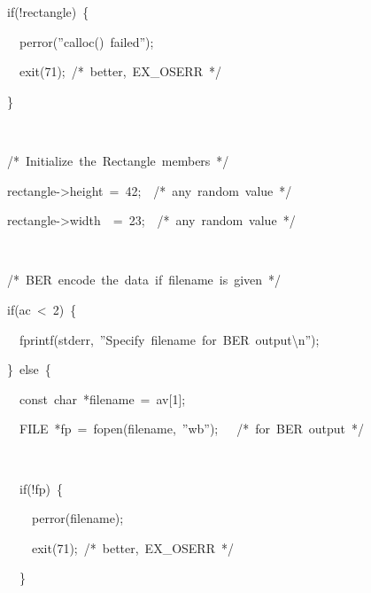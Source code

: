 \documentclass[english,oneside,12pt]{book}
\newenvironment{lyxcode}
{\par\begin{list}{}{
\setlength{\rightmargin}{\leftmargin}
\setlength{\listparindent}{0pt}%
\raggedright
\setlength{\itemsep}{0pt}
\setlength{\parsep}{0pt}
\normalfont\ttfamily}%
 \item[]}
{\end{list}}
\begin{document}
\begin{enumerate}
\begin{lyxcode}
{\small{}~~~~if(!rectangle)~\{}{\small \par}

{\small{}~~~~~~perror(''calloc()~failed'');}{\small \par}

{\small{}~~~~~~exit(71);~/{*}~better,~EX\_OSERR~{*}/}{\small \par}

{\small{}~~~~\}}{\small \par}

{\small{}~}{\small \par}

{\small{}~~~~/{*}~Initialize~the~Rectangle~members~{*}/}{\small \par}

{\small{}~~~~rectangle->height~=~42;~~/{*}~any~random~value~{*}/}{\small \par}

{\small{}~~~~rectangle->width~~=~23;~~/{*}~any~random~value~{*}/}{\small \par}

{\small{}~~~~~}{\small \par}

{\small{}~~~~/{*}~BER~encode~the~data~if~filename~is~given~{*}/}{\small \par}

{\small{}~~~~if(ac~<~2)~\{}{\small \par}

{\small{}~~~~~~fprintf(stderr,~''Specify~filename~for~BER~output\textbackslash{}n'');}{\small \par}

{\small{}~~~~\}~else~\{}{\small \par}

{\small{}~~~~~~const~char~{*}filename~=~av{[}1{]};}{\small \par}

{\small{}~~~~~~FILE~{*}fp~=~fopen(filename,~''wb'');~~~/{*}~for~BER~output~{*}/}{\small \par}

~

{\small{}~~~~~~if(!fp)~\{}{\small \par}

{\small{}~~~~~~~~perror(filename);}{\small \par}

{\small{}~~~~~~~~exit(71);~/{*}~better,~EX\_OSERR~{*}/}{\small \par}

{\small{}~~~~~~\}}{\small \par}


\end{lyxcode}
\end{enumerate}
\end{document}
